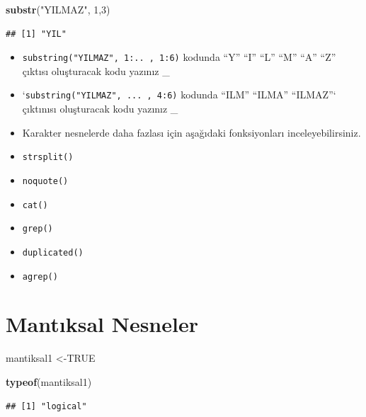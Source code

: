 \documentclass[
  oneside]{book}
\newenvironment{Shaded}{\begin{snugshade}}{\end{snugshade}}
\newcommand{\ConstantTok}[1]{\textcolor[rgb]{0.56,0.35,0.01}{#1}}
\newcommand{\DecValTok}[1]{\textcolor[rgb]{0.00,0.00,0.81}{#1}}
\newcommand{\FunctionTok}[1]{\textcolor[rgb]{0.13,0.29,0.53}{\textbf{#1}}}
\newcommand{\NormalTok}[1]{#1}
\newcommand{\OtherTok}[1]{\textcolor[rgb]{0.56,0.35,0.01}{#1}}
\newcommand{\StringTok}[1]{\textcolor[rgb]{0.31,0.60,0.02}{#1}}
\begin{document}
\begin{Shaded}
\begin{Highlighting}[]
\FunctionTok{substr}\NormalTok{(}\StringTok{"YILMAZ"}\NormalTok{, }\DecValTok{1}\NormalTok{,}\DecValTok{3}\NormalTok{)}
\end{Highlighting}
\end{Shaded}

\begin{verbatim}
## [1] "YIL"
\end{verbatim}

\begin{itemize}
\item
  \texttt{substring("YILMAZ",\ 1:..\ ,\ 1:6)} kodunda ``Y'' ``I'' ``L'' ``M'' ``A'' ``Z'' çıktısı oluşturacak kodu yazınız \_
\item
  `\texttt{substring("YILMAZ",\ ...\ ,\ 4:6)} kodunda ``ILM'' ``ILMA'' ``ILMAZ''` çıktınısı oluşturacak kodu yazınız \_
\item
  Karakter nesnelerde daha fazlası için aşağıdaki fonksiyonları inceleyebilirsiniz.
\item
  \texttt{strsplit()}
\item
  \texttt{noquote()}
\item
  \texttt{cat()}
\item
  \texttt{grep()}
\item
  \texttt{duplicated()}
\item
  \texttt{agrep()}
\end{itemize}

\hypertarget{mantux131ksal-nesneler}{%
\section{Mantıksal Nesneler}\label{mantux131ksal-nesneler}}

\begin{Shaded}
\begin{Highlighting}[]
\NormalTok{mantiksal1 }\OtherTok{\textless{}{-}}\ConstantTok{TRUE}
\end{Highlighting}
\end{Shaded}

\begin{Shaded}
\begin{Highlighting}[]
\FunctionTok{typeof}\NormalTok{(mantiksal1)}
\end{Highlighting}
\end{Shaded}

\begin{verbatim}
## [1] "logical"
\end{verbatim}
\end{document}
